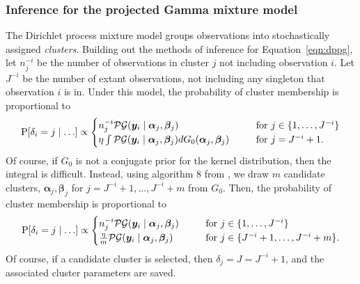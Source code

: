 \subsubsection{Inference for the projected Gamma mixture model}
The Dirichlet process mixture model groups observations into stochastically assigned \emph{clusters}.  Building out the methods of inference for Equation~\ref{eqn:dppg}, let $n_j^{-i}$ be the number of observations in cluster $j$ not including observation $i$.  Let $J^{-i}$ be the number of extant observations, not including any singleton that observation $i$ is in. Under this model, the probability of cluster membership is proportional to
\begin{equation*}
    \text{P}\left[\delta_i = j\mid\ldots\right] \propto \begin{cases}
        n_j^{-i}\mathcal{PG}\left(\bm{y}_i\mid\bm{\alpha}_j,\bm{\beta}_j\right)\hspace{0.5cm} &\text{~for~}j \in \lbrace 1,\ldots,J^{-i}\rbrace\\
        \eta\int\mathcal{PG}\left(\bm{y}_i\mid\bm{\alpha}_j,\bm{\beta}_j\right)dG_0(\bm{\alpha}_j,\bm{\beta}_j)\hspace{0.5cm} &\text{~for~}j = J^{-i} + 1.
        \end{cases}
\end{equation*}
Of course, if $G_0$ is not a conjugate prior for the kernel distribution, then the integral is difficult.  Instead, using algorithm 8 from \cite{neal2000}, we draw $m$ candidate clusters, $\bm{\alpha}_j,\bm{\beta}_j$ for $j = J^{-i} + 1,\ldots, J^{-i} + m$ from $G_0$. Then, the probability of cluster membership is proportional to
\begin{equation}
    \text{P}\left[\delta_i = j\mid\ldots\right] \propto \begin{cases}
        n_j^{-i}\mathcal{PG}\left(\bm{y}_i\mid\bm{\alpha}_j,\bm{\beta}_j\right)\hspace{0.5cm} &\text{~for~}j \in \lbrace 1,\ldots,J^{-i}\rbrace\\
        \frac{\eta}{m}\mathcal{PG}\left(\bm{y}_i\mid\bm{\alpha}_j,\bm{\beta}_j\right)\hspace{0.5cm} &\text{~for~}j \in \lbrace J^{-i} + 1,\ldots, J^{-i} + m\rbrace.
        \end{cases}
\end{equation}
Of course, if a candidate cluster is selected, then $\delta_j = J = J^{- i} + 1$, and the associated cluster parameters are saved.

